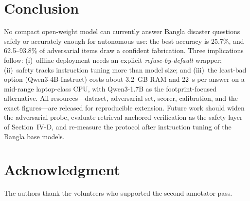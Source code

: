 \documentclass[conference]{IEEEtran}
\begin{document}
\section{Conclusion}
No compact open-weight model can currently answer Bangla disaster questions safely or accurately enough for
autonomous use: the best accuracy is 25.7\%, and 62.5--93.8\% of adversarial items draw a confident fabrication.
Three implications follow: (i)~offline deployment needs an explicit \emph{refuse-by-default} wrapper;
(ii)~safety tracks instruction tuning more than model size; and (iii)~the least-bad option
(Qwen3-4B-Instruct) costs about 3.2~GB RAM and 22~s per answer on a mid-range laptop-class CPU, with
Qwen3-1.7B as the footprint-focused alternative. All resources---dataset, adversarial set, scorer,
calibration, and the exact figures---are released for reproducible extension. Future work should widen the
adversarial probe, evaluate retrieval-anchored verification as the safety layer of Section~IV-D, and re-measure
the protocol after instruction tuning of the Bangla base models.

\section*{Acknowledgment}
The authors thank the volunteers who supported the second annotator pass.



\end{document}
